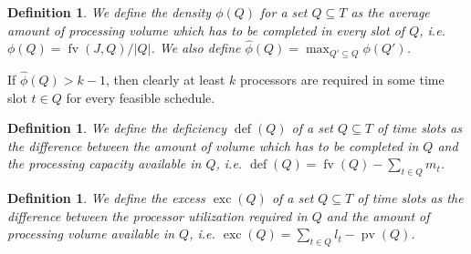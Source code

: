 \documentclass[a4paper]{article}
\DeclareMathOperator{\fv}{fv}
\DeclareMathOperator{\pv}{pv}
\DeclareMathOperator{\opdef}{def}
\DeclareMathOperator{\exc}{exc}
\newtheorem{definition}[theorem]{Definition}
\begin{document}
\begin{definition}
  We define the \emph{density} $\phi(Q)$ for a set $Q \subseteq T$ as the average amount of processing volume which has to be completed in every slot of $Q$, i.e.
  $\phi(Q) = \fv(J, Q) / |Q|$.
  We also define $\hat \phi(Q) = \max_{Q' \subseteq Q} \phi(Q')$.
\end{definition}
If $\hat \phi(Q) > k - 1$, then clearly at least $k$ processors are required in some time slot $t \in Q$ for every feasible schedule.
\begin{definition}
  We define the \emph{deficiency} $\opdef(Q)$ of a set $Q \subseteq T$ of time slots as the difference between the amount of volume which has to be completed in $Q$ and the processing capacity available in $Q$, i.e. $\opdef(Q) = \fv(Q) - \sum_{t \in Q} m_t$.
\end{definition}
\begin{definition}
  We define the \emph{excess} $\exc(Q)$ of a set $Q \subseteq T$ of time slots as the difference between the processor utilization required in $Q$ and the amount of processing volume available in $Q$, i.e. $\exc(Q) = \sum_{t \in Q} l_t - \pv(Q)$.
\end{definition}
\end{document}
